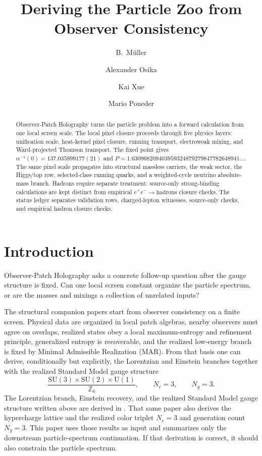 \documentclass[11pt]{article}
\title{Deriving the Particle Zoo from\\
Observer Consistency}
\author{B.\ M\"uller \and Alexander Osika \and Kai Xue \and Mario Poneder}
\date{\OPHPaperReleaseDate}
\newcommand{\SU}{\mathrm{SU}}
\newcommand{\U}{\mathrm{U}}
\begin{document}
\maketitle
\OPHPaperReleaseBanner

\begin{abstract}
Observer-Patch Holography turns the particle problem into a forward calculation from one local screen scale. The local pixel closure proceeds through five physics layers: unification scale, heat-kernel pixel closure, running transport, electroweak mixing, and Ward-projected Thomson transport. The fixed point gives \(\alpha^{-1}(0)=137.035999177(21)\) and \(P=1.630968209403959324879279847782648941\ldots\). The same pixel scale propagates into structural massless carriers, the weak sector, the Higgs/top row, selected-class running quarks, and a weighted-cycle neutrino absolute-mass branch. Hadrons require separate treatment: source-only strong-binding calculations are kept distinct from empirical \(e^+e^-\to\mathrm{hadrons}\) closure checks. The status ledger separates validation rows, charged-lepton witnesses, source-only checks, and empirical hadron closure checks.
\end{abstract}

\section{Introduction}

Observer-Patch Holography asks a concrete follow-up question after the gauge structure is fixed.
Can one local screen constant organize the particle spectrum, or are the masses and mixings a
collection of unrelated inputs?

The structural companion papers start from observer consistency on a finite screen. Physical data are organized in local patch algebras, nearby observers must agree on overlaps, realized states obey a local maximum-entropy and refinement principle, generalized entropy is recoverable, and the realized low-energy branch is fixed by Minimal Admissible Realization (MAR). From that basis one can derive, conditionally but explicitly, the Lorentzian and Einstein branches together with the realized Standard Model gauge structure
\[
\frac{\SU(3)\times\SU(2)\times\U(1)}{\mathbb Z_6},
\qquad
N_c=3,
\qquad
N_g=3.
\]
The Lorentzian branch, Einstein recovery, and the realized Standard Model gauge structure written
above are derived in \cite{ophcompact}. That same paper also derives the hypercharge lattice and
the realized color triplet \(N_c=3\) and generation count \(N_g=3\). This paper uses those results as input and summarizes only the
downstream particle-spectrum continuation. If that derivation is correct, it should also constrain the particle spectrum.
\end{document}
